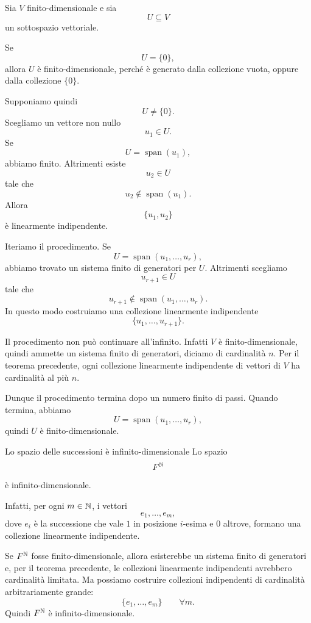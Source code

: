 \documentclass[a4paper]{article}
\begin{document}
\begin{snippetproof}{}
    Sia \(V\) finito-dimensionale e sia
    \[
        U\subseteq V
    \]
    un sottospazio vettoriale.

    Se
    \[
        U=\{0\},
    \]
    allora \(U\) è finito-dimensionale, perché è generato dalla collezione vuota, oppure dalla collezione \(\{0\}\).

    Supponiamo quindi
    \[
        U\neq\{0\}.
    \]
    Scegliamo un vettore non nullo
    \[
        u_1\in U.
    \]
    Se
    \[
        U=\operatorname{span}(u_1),
    \]
    abbiamo finito. Altrimenti esiste
    \[
        u_2\in U
    \]
    tale che
    \[
        u_2\notin\operatorname{span}(u_1).
    \]
    Allora
    \[
        \{u_1,u_2\}
    \]
    è linearmente indipendente.

    Iteriamo il procedimento. Se
    \[
        U=\operatorname{span}(u_1,\ldots,u_r),
    \]
    abbiamo trovato un sistema finito di generatori per \(U\). Altrimenti scegliamo
    \[
        u_{r+1}\in U
    \]
    tale che
    \[
        u_{r+1}\notin\operatorname{span}(u_1,\ldots,u_r).
    \]
    In questo modo costruiamo una collezione linearmente indipendente
    \[
        \{u_1,\ldots,u_{r+1}\}.
    \]

    Il procedimento non può continuare all'infinito. Infatti \(V\) è finito-dimensionale, quindi ammette un sistema finito di generatori, diciamo di cardinalità \(n\). Per il teorema precedente, ogni collezione linearmente indipendente di vettori di \(V\) ha cardinalità al più \(n\).

    Dunque il procedimento termina dopo un numero finito di passi. Quando termina, abbiamo
    \[
        U=\operatorname{span}(u_1,\ldots,u_r),
    \]
    quindi \(U\) è finito-dimensionale.
\end{snippetproof}

\begin{snippetexample}{Lo spazio delle successioni è infinito-dimensionale}
    Lo spazio
    \[
        F^{\mathbb{N}}
    \]
    è infinito-dimensionale.

    Infatti, per ogni \(m\in\mathbb{N}\), i vettori
    \[
        e_1,\ldots,e_m,
    \]
    dove \(e_i\) è la successione che vale \(1\) in posizione \(i\)-esima e \(0\) altrove, formano una collezione linearmente indipendente.

    Se \(F^{\mathbb{N}}\) fosse finito-dimensionale, allora esisterebbe un sistema finito di generatori e, per il teorema precedente, le collezioni linearmente indipendenti avrebbero cardinalità limitata. Ma possiamo costruire collezioni indipendenti di cardinalità arbitrariamente grande:
    \[
        \{e_1,\ldots,e_m\}
        \qquad
        \forall m.
    \]
    Quindi \(F^{\mathbb{N}}\) è infinito-dimensionale.
\end{snippetexample}
\end{document}
